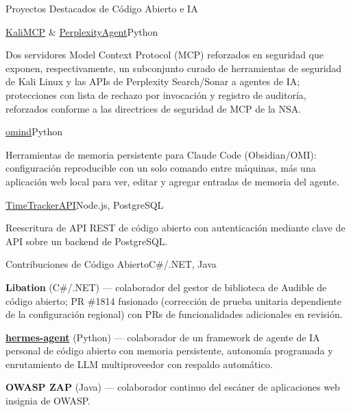 \documentclass{resume} %
\begin{document}
\begin{rSection}{Proyectos Destacados de C\'odigo Abierto e IA}

\begin{rSubsection}{\href{https://github.com/CryptoJones/KaliMCP}{KaliMCP} \& \href{https://github.com/CryptoJones/PerplexityAgent}{PerplexityAgent}}{Python}{}{}
\item Dos servidores Model Context Protocol (MCP) reforzados en seguridad que exponen, respectivamente, un subconjunto curado de herramientas de seguridad de Kali Linux y las APIs de Perplexity Search/Sonar a agentes de IA; protecciones con lista de rechazo por invocaci\'on y registro de auditor\'ia, reforzados conforme a las directrices de seguridad de MCP de la NSA.
\end{rSubsection}

\begin{rSubsection}{\href{https://github.com/CryptoJones/omind}{omind}}{Python}{}{}
\item Herramientas de memoria persistente para Claude Code (Obsidian/OMI): configuraci\'on reproducible con un solo comando entre m\'aquinas, m\'as una aplicaci\'on web local para ver, editar y agregar entradas de memoria del agente.
\end{rSubsection}

\begin{rSubsection}{\href{https://github.com/CryptoJones/TimeTrackerAPI}{TimeTrackerAPI}}{Node.js, PostgreSQL}{}{}
\item Reescritura de API REST de c\'odigo abierto con autenticaci\'on mediante clave de API sobre un backend de PostgreSQL.
\end{rSubsection}

\begin{rSubsection}{Contribuciones de C\'odigo Abierto}{C\#/.NET, Java}{}{}
\item {\bf Libation} (C\#/.NET) --- colaborador del gestor de biblioteca de Audible de c\'odigo abierto; PR \#1814 fusionado (correcci\'on de prueba unitaria dependiente de la configuraci\'on regional) con PRs de funcionalidades adicionales en revisi\'on.
\item {\bf \href{https://github.com/CryptoJones/hermes-agent}{hermes-agent}} (Python) --- colaborador de un framework de agente de IA personal de c\'odigo abierto con memoria persistente, autonom\'ia programada y enrutamiento de LLM multiproveedor con respaldo autom\'atico.
\item {\bf OWASP ZAP} (Java) --- colaborador continuo del esc\'aner de aplicaciones web insignia de OWASP.
\end{rSubsection}

\end{rSection}
\end{document}

